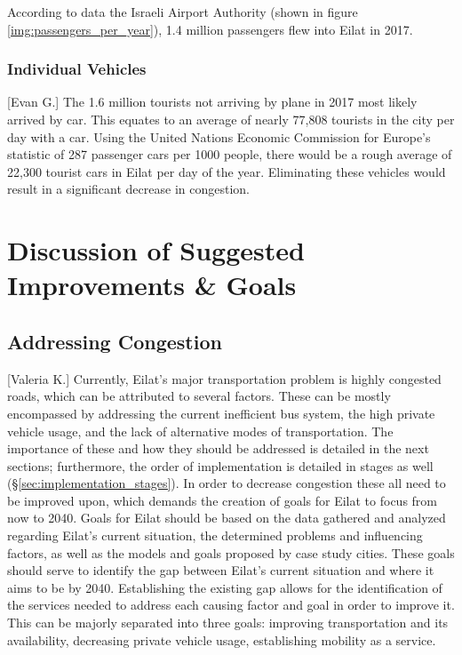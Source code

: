 \documentclass[12pt]{article}                               %
\begin{document}
According to data the Israeli Airport Authority (shown in figure \ref{img:passengers_per_year}), 1.4 million passengers flew into Eilat in 2017.

\subsubsection{Individual Vehicles}[Evan G.]
The 1.6 million tourists not arriving by plane in 2017 most likely arrived by car. This equates to an average of nearly 77,808 tourists in the city per day with a car. Using the United Nations Economic Commission for Europe's statistic of 287 passenger cars per 1000 people, there would be a rough average of 22,300 tourist cars in Eilat per day of the year. Eliminating these vehicles would result in a significant decrease in congestion.




\newpage
\section{Discussion of Suggested Improvements \& Goals}\label{sec:discussion}
\subsection{Addressing Congestion}[Valeria K.]
Currently, Eilat's major transportation problem is highly congested roads, which can be attributed to several factors. These can be mostly encompassed by addressing the current inefficient bus system, the high private vehicle usage, and the lack of alternative modes of transportation. The importance of these and how they should be addressed is detailed in the next sections; furthermore, the order of implementation is detailed in stages as well (\S\ref{sec:implementation_stages}). In order to decrease congestion these all need to be improved upon, which demands the creation of goals for Eilat to focus from now to 2040. Goals for Eilat should be based on the data gathered and analyzed regarding Eilat's current situation, the determined problems and influencing factors, as well as the models and goals proposed by case study cities. These goals should serve to identify the gap between Eilat's current situation and where it aims to be by 2040. Establishing the existing gap allows for the identification of the services needed to address each causing factor and goal in order to improve it. This can be majorly separated into three goals: improving transportation and its availability, decreasing private vehicle usage,  establishing mobility as a service. 
\end{document}

